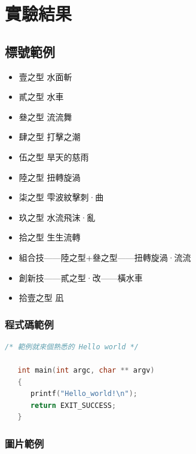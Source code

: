 \chapter{實驗結果}\label{result}

\section{標號範例}
\begin{itemize}
\item 壹之型 水面斬
\item 貳之型 水車
\item 叄之型 流流舞
\item 肆之型 打擊之潮
\item 伍之型 旱天的慈雨
\item 陸之型 扭轉旋渦
\item 柒之型 雫波紋擊刺·曲
\item 玖之型 水流飛沫·亂
\item 拾之型 生生流轉
\item 組合技——陸之型+叄之型——扭轉旋渦·流流
\item 創新技——貳之型·改——橫水車
\item 拾壹之型 凪
\end{itemize}

\clearpage

\subsection{程式碼範例}

\begin{lstlisting}[language=C]
   /* 範例就來個熟悉的 Hello world */

   int main(int argc, char ** argv) 
   { 
      printf("Hello_world!\n");
      return EXIT_SUCCESS; 
   }
\end{lstlisting}

\subsection{圖片範例}

